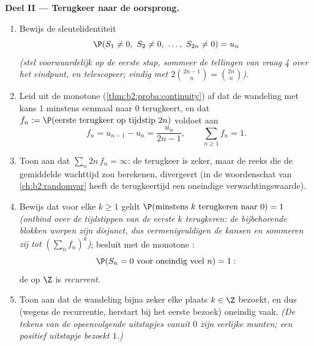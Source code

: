 \begin{problem}
\medskip
\noindent\textbf{Deel II --- Terugkeer naar de oorsprong.}
\begin{enumerate}[resume]
  \item Bewijs de sleutelidentiteit
        \[
        \P(S_1 \neq 0,\ S_2 \neq 0,\ \dots,\ S_{2n} \neq 0) =
        u_n
        \]
        \emph{(stel voorwaardelijk op de eerste stap, sommeer de
        tellingen van vraag 4 over het eindpunt, en telescopeer;
        eindig met $2\binom{2n-1}{n} = \binom{2n}{n}$)}.
  \item Leid uit de monotone 
        (\cref{thm:b2:proba:continuity}) af dat de wandeling met
        kans $1$ minstens eenmaal naar $0$ terugkeert, en dat $f_n
        := \P(\text{eerste terugkeer op tijdstip }2n)$ voldoet aan
        \[
        f_n = u_{n-1} - u_n = \frac{u_n}{2n-1},
        \qquad \sum_{n\geq1}f_n = 1 .
        \]
  \item Toon aan dat $\sum_n 2n\,f_n = \infty$: de terugkeer is
        zeker, maar de reeks die de gemiddelde wachttijd zou
        berekenen, divergeert (in de woordenschat van
        \cref{ch:b2:randomvar} heeft de terugkeertijd een oneindige
        verwachtingswaarde).
  \item Bewijs dat voor elke $k \geq 1$ geldt $\P(\text{minstens }
        k\text{ terugkeren naar }0) = 1$ \emph{(ontbind over de
        tijdstippen van de eerste $k$ terugkeren: de bijbehorende
        blokken worpen zijn disjunct, dus vermenigvuldigen de
        kansen en sommeren zij tot $(\sum_nf_n)^k$)}; besluit met
        de monotone :
        \[
        \P(S_n = 0 \text{ voor oneindig veel } n) = 1 :
        \]
        de  op $\Z$ is \emph{recurrent}.
  \item Toon aan dat de wandeling bijna zeker elke plaats $k \in
        \Z$ bezoekt, en dus (wegens de recurrentie, herstart bij
        het eerste bezoek) oneindig vaak. \emph{(De tekens van de
        opeenvolgende uitstapjes vanuit $0$ zijn 
        eerlijke munten; een positief uitstapje bezoekt $1$.)}
\end{enumerate}


\end{problem}

